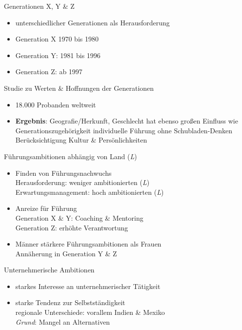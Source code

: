 \documentclass{cheatsheet}
\begin{document}
    \begin{sectionbox}{Generationen X, Y \& Z}
        \begin{itemize}
            \item unterschiedlicher Generationen als Herausforderung
            \item Generation X 1970 bis 1980
            \item Generation Y: 1981 bis 1996
            \item Generation Z: ab 1997
        \end{itemize}
    \end{sectionbox}
    \begin{hintbox}{Studie zu Werten \& Hoffnungen der Generationen}
        \begin{itemize}
            \item 18.000 Probanden weltweit
            \item \textbf{Ergebnis}: Geografie/Herkunft, Geschlecht hat ebenso großen Einfluss wie Generationszugehörigkeit
            \ra individuelle Führung ohne Schubladen-Denken\\
            \ra Berücksichtigung Kultur \& Persönlichkeiten
        \end{itemize}
    \end{hintbox}
    \begin{hintbox}{Führungsambitionen abhängig von Land (\emph{L})}
        \begin{itemize}
            \item Finden von Führungsnachwuchs\\
            \ra Herausforderung: weniger ambitionierten (\emph{L})\\
            \ra Erwartungsmanagement: hoch ambitionierten (\emph{L})
            \item Anreize für Führung\\
            \ra Generation X \& Y: Coaching \& Mentoring\\
            \ra Generation Z: erhöhte Verantwortung
            \item Männer stärkere Führungsambitionen als Frauen\\
            \ra Annäherung in Generation Y \& Z
        \end{itemize}
    \end{hintbox}
    \begin{hintbox}{Unternehmerische Ambitionen}
        \begin{itemize}
            \item starkes Interesse an unternehmerischer Tätigkeit
            \item starke Tendenz zur Selbstständigkeit\\
            \ra regionale Unterschiede: vorallem Indien \& Mexiko\\
            \ra \emph{Grund}: Mangel an Alternativen
        \end{itemize}
    \end{hintbox}
\end{document}
